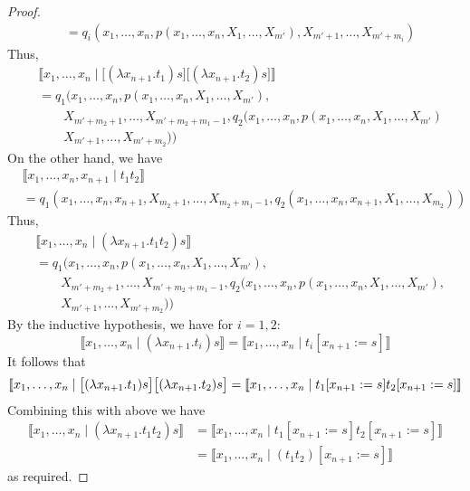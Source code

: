 \documentclass[12pt]{article}
\theoremstyle{plain}
\theoremstyle{definition}
\begin{document}
\begin{proof}
\begin{align*}
		&= q_i(x_1, \ldots, x_n, p(x_1, \ldots, x_n, X_{1}, \ldots, X_{m'}), X_{m' + 1}, \ldots, X_{m' + m_i})
		\end{align*}
	Thus,
	\begin{align*}
		&\llbracket x_1, \ldots, x_n \mid \big[(\lambda x_{n+1}. t_1)s\big]\big[ (\lambda x_{n+1}.t_2)s\big]\rrbracket\\
		&= q_1(x_1, \ldots, x_n, p(x_1, \ldots, x_n, X_1, \ldots, X_{m'}),\\
		&\qquad X_{m' + m_2 + 1}, \ldots, X_{m' + m_2 + m_1 - 1},  q_2(x_1, \ldots, x_n, p(x_1, \ldots, x_n, X_1, \ldots, X_{m'})\\
		&\qquad X_{m' + 1}, \ldots, X_{m' + m_2}))
		\end{align*}
	On the other hand, we have
	\begin{align*}
		&\llbracket x_1, \ldots, x_n, x_{n+1} \mid t_1 t_2 \rrbracket\\
		&= q_1(x_1, \ldots, x_n, x_{n+1}, X_{m_2 + 1}, \ldots, X_{m_2 + m_1 - 1}, q_2(x_1, \ldots, x_n, x_{n+1}, X_{1}, \ldots, X_{m_2}))
		\end{align*}
	Thus,
	\begin{align*}
		&\llbracket x_1, \ldots, x_n \mid (\lambda x_{n+1}. t_1 t_2)s\rrbracket\\
		&= q_1(x_1, \ldots, x_n, p(x_1, \ldots, x_n, X_{1}, \ldots, X_{m'}), \\
		&\qquad X_{m' + m_2 + 1}, \ldots, X_{m' + m_2 + m_1 - 1}, q_2(x_1, \ldots, x_n, p(x_1, \ldots, x_n, X_{1}, \ldots, X_{ m'}),\\
		&\qquad X_{m' + 1}, \ldots, X_{m' + m_2}))
		\end{align*}
	By the inductive hypothesis, we have for $i = 1,2$:
	\begin{equation}
		\llbracket x_1, \ldots, x_n \mid (\lambda x_{n+1}. t_i)s\rrbracket = \llbracket x_1, \ldots, x_n \mid t_i[x_{n+1} := s]\rrbracket
		\end{equation}
	It follows that
	\begin{equation}
		\llbracket x_1, \ldots, x_n \mid \big[(\lambda x_{n+1}. t_1)s\big]\big[(\lambda x_{n+1}. t_2)s\big] = \llbracket x_1, \ldots, x_n \mid t_1[x_{n+1} := s]t_2[x_{n+1} := s]\rrbracket\\
		\end{equation}
	Combining this with above we have
	\begin{align*}
		\llbracket x_1, \ldots, x_n \mid (\lambda x_{n+1}.t_1t_2)s\rrbracket &= \llbracket x_1, \ldots, x_n \mid t_1[x_{n+1} := s]t_2[x_{n+1} := s]\rrbracket\\
		&= \llbracket x_1, \ldots, x_n \mid (t_1 t_2)[x_{n+1} := s] \rrbracket
		\end{align*}
	as required.
	\end{proof}
	
	
	
	
	
	
	
	
	
	
	
	
	
	
	
	
	
	
	
	
	
	
	
	
\end{document}
